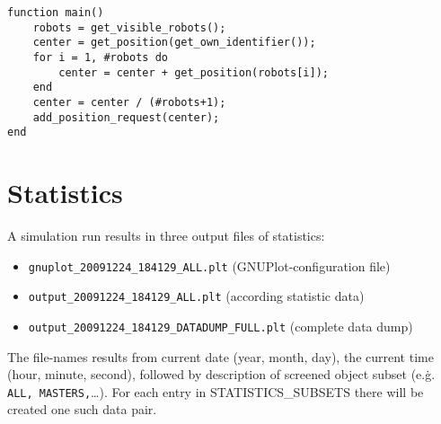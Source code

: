 \documentclass[a4paper,halfparskip,11pt,twoside]{scrartcl}
\begin{document}

\lstset{language=c}
\begin{lstlisting}[caption={COG algorithm in Lua},label=lst:cog-lua]
function main() 
    robots = get_visible_robots();
    center = get_position(get_own_identifier());
    for i = 1, #robots do
        center = center + get_position(robots[i]);
    end
    center = center / (#robots+1);
    add_position_request(center);
end
\end{lstlisting}

\section{Statistics}
A simulation run results in three output files of statistics:

\begin{itemize}
\item \texttt{gnuplot\_20091224\_184129\_ALL.plt} (GNUPlot-configuration file)
\item \texttt{output\_20091224\_184129\_ALL.plt} (according statistic data)
\item \texttt{output\_20091224\_184129\_DATADUMP\_FULL.plt} (complete data dump)
\end{itemize}

The file-names results from current date (year, month, day), the current time (hour, minute, second), followed by description of screened object subset (e.\.g. \texttt{ALL, MASTERS,}\dots). For each entry in STATISTICS\_SUBSETS there will be created one such data pair.

\newpage
\appendix

	\newpage


\newpage
\thispagestyle{empty}
~
\end{document}
